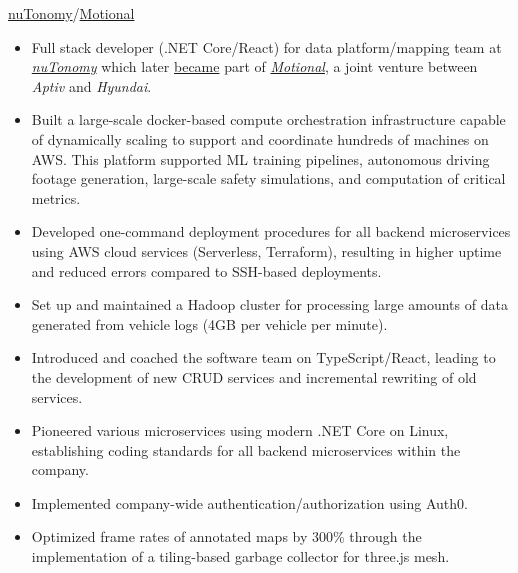 \documentclass[]{cv} %
\begin{document}
\entry
{\href{https://en.wikipedia.org/wiki/NuTonomy}{nuTonomy}/\href{https://www.aptiv.com/solutions/autonomous-mobility}{Motional}}
{
\begin{itemize}
\item Full stack developer (.NET Core/React) for data platform/mapping team at \href{https://en.wikipedia.org/wiki/NuTonomy}{\emph{nuTonomy}} which later \href{https://techcrunch.com/2017/10/24/delphi-buys-nutonomy-for-400-million-to-scale-and-deliver-autonomous-vehicles/}{became} part of \href{https://www.aptiv.com/solutions/autonomous-mobility}{\emph{Motional}}, a joint venture between \emph{Aptiv} and \emph{Hyundai}.
\item Built a large-scale docker-based compute orchestration infrastructure capable of dynamically scaling to support and coordinate hundreds of machines on AWS. This platform supported ML training pipelines, autonomous driving footage generation, large-scale safety simulations, and computation of critical metrics.
\item Developed one-command deployment procedures for all backend microservices using AWS cloud services (Serverless, Terraform), resulting in higher uptime and reduced errors compared to SSH-based deployments.
\item Set up and maintained a Hadoop cluster for processing large amounts of data generated from vehicle logs (4GB per vehicle per minute).
\item Introduced and coached the software team on TypeScript/React, leading to the development of new CRUD services and incremental rewriting of old services.
\item Pioneered various microservices using modern .NET Core on Linux, establishing coding standards for all backend microservices within the company.
\item Implemented company-wide authentication/authorization using Auth0.
\item Optimized frame rates of annotated maps by 300\% through the implementation of a tiling-based garbage collector for three.js mesh.
\end{itemize}
}
\end{document}
